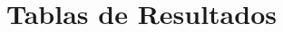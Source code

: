 \chapter{Tablas de Resultados}\label{appendix:resultados} 

\begin{center}
    \begin{adjustbox}{width=0.55\textwidth}
    
    \end{adjustbox}
    \label{experimentos:by_quantifier}
\end{center}

\begin{center}
    \begin{adjustbox}{width=0.75\textwidth}
    
    \end{adjustbox}
    \label{experimentos:by_classifier}
\end{center}

\begin{center}
    \begin{adjustbox}{width=0.55\textwidth}
    
    \end{adjustbox}
    \label{experimentos:by_population}
\end{center}

\begin{center}
    \begin{adjustbox}{width=0.55\textwidth}
    
    \end{adjustbox}
    \label{experimentos:by_train_sample_size}
\end{center}

\begin{center}
    \begin{adjustbox}{width=0.6\textwidth}
    
    \end{adjustbox}
    \label{experimentos:by_test_sample_size}
\end{center}

\begin{center}
    \begin{adjustbox}{width=0.6\textwidth}
    
    \end{adjustbox}
    \label{experimentos:by_train_prev}
\end{center}

